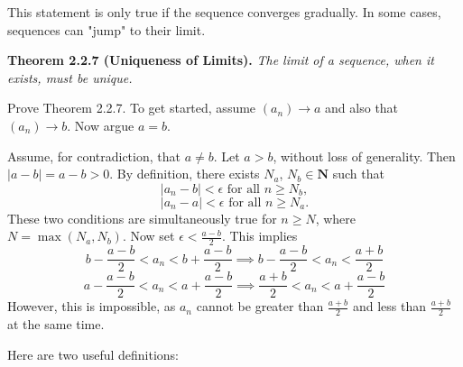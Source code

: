 \begin{solution}
  This statement is only true if the sequence converges gradually. In some cases, sequences can "jump" to their limit.
\end{solution}

\begin{exercise}
  \textbf{Theorem 2.2.7 (Uniqueness of Limits).} \textit{The limit of a sequence, when it exists, must be unique.}

  Prove Theorem 2.2.7. To get started, assume $\left(a_{n}\right) \rightarrow a$ and also that $\left(a_{n}\right) \rightarrow b$. Now argue $a=b$.
\end{exercise}

\begin{solution}
  Assume, for contradiction, that $a\neq b$. Let $a > b$, without loss of generality. Then $|a-b|=a-b>0$. By definition, there exists $N_a$, $N_b\in\mathbf{N}$ such that $$|a_n-b|<\epsilon \text{ for all } n\geq N_b,$$ $$|a_n-a|<\epsilon \text{ for all } n\geq N_a.$$ These two conditions are simultaneously true for $n\geq N$, where $N=\max(N_a, N_b)$. Now set $\epsilon<\frac{a-b}{2}$. This implies $$b-\frac{a-b}{2}<a_n<b+\frac{a-b}{2}\implies b-\frac{a-b}{2}<a_n<\frac{a+b}{2}$$ $$a-\frac{a-b}{2}<a_n<a+\frac{a-b}{2}\implies \frac{a+b}{2}<a_n<a+\frac{a-b}{2}$$ However, this is impossible, as $a_n$ cannot be greater than $\frac{a+b}{2}$ and less than $\frac{a+b}{2}$ at the same time.
\end{solution}

\begin{exercise}
  Here are two useful definitions:
\end{exercise}

